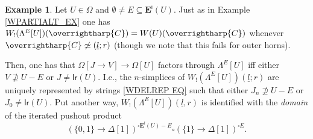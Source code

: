 \documentclass[a4paper,10pt
,draft
]{article}%
\numberwithin{equation}{section}
\numberwithin{figure}{section}
\theoremstyle{definition} %
\newtheorem{example}[equation]{Example}%
\newcommand{\vect}[1]{\text{\overrightharp{\ensuremath{#1}}}}
\newcommand{\1}{\ensuremath{\mathbbm 1}}%
\begin{document}
\begin{example}\label{WPARTIALT2_EX}
	Let $U\in \Omega$ and 
	$\emptyset \neq E \subseteq \boldsymbol{E}^{\mathsf{i}}(U)$.
	Just as in Example \ref{WPARTIALT_EX}
	one has 
	$W_!(\Lambda^E[U])(\vect{C}) = W(U)(\vect{C})$
	whenever $\vect{C} \not \simeq (\underline{l};r)$
	(though we note that this fails for outer horns).

	Then, one has that 
	$\Omega[J \to V] \to \Omega[U]$
	factors through $\Lambda^E[U]$
	iff either $V \not \supseteq U-E$ or $J \neq \mathsf{lr}(U)$.
	I.e., the $n$-simplices of
	$W_!(\Lambda^E[U])(\underline{l};r)$ 
	are uniquely represented by strings 
	\eqref{WDELREP EQ}
	such that either 
	$J_n \not \supseteq U-E$ or
	$J_0 \neq \mathsf{lr}(U)$. 
	Put another way, 
	$W_!(\Lambda^E[U])(\underline{l},r)$ 
	is identified with the \emph{domain} of
	the iterated pushout product
\[
	\left(
	\{0,1\} \to \Delta[1]
	\right)^{\square \boldsymbol{E}^{\mathsf{i}}(U)-E}
	\square
	\left(
	\{1\} \to \Delta[1]
	\right)^{\square E}.
\]
\end{example}








{}

\end{document}
